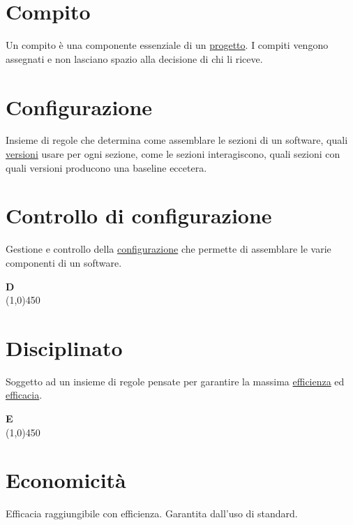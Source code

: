 \documentclass[11pt]{article}
\begin{document}
	\section{\LARGE Compito}
	\label{sec:compiti}
	Un compito è una componente essenziale di un \hyperref[sec:progetto]{progetto}. I compiti vengono assegnati e non lasciano spazio alla decisione di chi li riceve.
	
	\section{\LARGE Configurazione}
	\label{sec:configurazione}
	Insieme di regole che determina come assemblare le sezioni di un software, quali \hyperref[sec:versione]{versioni} usare per ogni sezione, come le sezioni interagiscono, quali sezioni con quali versioni producono una baseline eccetera.
	
	\section{\LARGE Controllo di configurazione}
	\label{sec:controlloconfigurazione}
	Gestione e controllo della \hyperref[sec:configurazione]{configurazione} che permette di assemblare le varie componenti di un software.\newpage

	{\Huge{\textbf{D}}} \\
	\line(1,0){450}

	\section{\LARGE Disciplinato}
	\label{sec:disciplinato}
	Soggetto ad un insieme di regole pensate per garantire la massima \hyperref[sec:efficienza]{efficienza} ed \hyperref[sec:efficacia]{efficacia}.\newpage

	{\Huge{\textbf{E}}} \\
	\line(1,0){450}

	\section{\LARGE Economicità}
	\label{sec:economicita}
	Efficacia raggiungibile con efficienza. Garantita dall'uso di standard.
	
\end{document}
